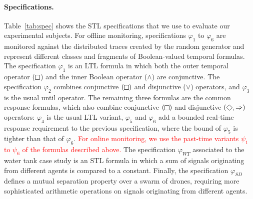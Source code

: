 \documentclass[iicol,lineno]{sn-jnl}
\renewcommand{\LTLf}{\LTLdiamond}
\renewcommand{\LTLg}{\LTLsquare}
\def\until{\kern.1em\mathcal{U}}
\newcommand{\?}{\text{?}}
\begin{document}
	\paragraph*{Specifications.}
	Table~\ref{tab:spec} shows the STL specifications that we use to evaluate our experimental subjects.
	For offline monitoring, specifications $\varphi_{1}$ to $\varphi_{6}$ are monitored against the distributed traces created by the random generator and represent different classes and fragments of Boolean-valued temporal formulas.
	The specification $\varphi_1$ is an LTL formula in which both the outer temporal operator ($\LTLg$) and the inner Boolean operator ($\wedge$) are conjunctive.
	The specification $\varphi_2$ combines conjunctive $(\LTLg)$ and disjunctive ($\lor$) operators, and $\varphi_3$ is the usual until operator.
	The remaining three formulas are the common response formulas, which also combine conjunctive $(\LTLg)$ and disjunctive $(\LTLf, \Rightarrow)$ operators: $\varphi_4$ is the usual LTL variant, $\varphi_5$ and $\varphi_6$ add a bounded real-time response requirement to the previous specification, where the bound of $\varphi_5$ is tighter than that of $\varphi_6$.
	\textcolor{red}{For online monitoring, we use the past-time variants $\psi_1$ to $\psi_6$ of the formulas described above.}
	The specification $\varphi_{WT}$ associated to the water tank case study is an STL formula in which a sum of signals originating from different agents is compared to a constant. Finally, the specification $\varphi_{SD}$ defines a mutual separation property over a swarm of drones, requiring more sophisticated arithmetic operations on signals originating from different agents.
	
		
\end{document}
